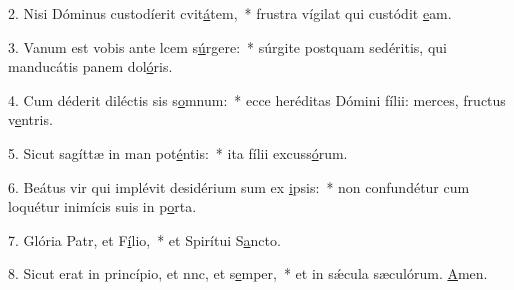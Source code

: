 2. Nisi Dóminus custodíerit cvit\uline{á}tem,~* frustra vígilat qui custódit \uline{e}am.\par 
3. Vanum est vobis ante lcem s\uline{ú}rgere:~* súrgite postquam sedéritis, qui manducátis panem dol\uline{ó}ris.\par 
4. Cum déderit diléctis sis s\uline{o}mnum:~* ecce heréditas Dómini fílii: merces, fructus v\uline{e}ntris.\par 
5. Sicut sagíttæ in man pot\uline{é}ntis:~* ita fílii excuss\uline{ó}rum.\par 
6. Beátus vir qui implévit desidérium sum ex \uline{i}psis:~* non confundétur cum loquétur inimícis suis in p\uline{o}rta.\par 
7. Glória Patr, et F\uline{í}lio,~* et Spirítui S\uline{a}ncto.\par 
8. Sicut erat in princípio, et nnc, et s\uline{e}mper,~* et in sǽcula sæculórum. \uline{A}men.\par 
